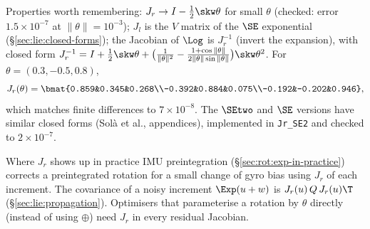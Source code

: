 Properties worth remembering: $J_r\to I-\frac12\skw\theta$ for small $\theta$ (checked: error $1.5\times10^{-7}$ at $\|\theta\|=10^{-3}$); $J_l$ is the $V$ matrix of the $\SE$ exponential (\S\ref{sec:lie:closed-forms}); the Jacobian of $\Log$ is $J_r^{-1}$ (invert the expansion), with closed form $J_r^{-1}=I+\frac12\skw\theta+\big(\frac1{\|\theta\|^2}-\frac{1+\cos\|\theta\|}{2\|\theta\|\sin\|\theta\|}\big)\skw\theta^2$. For $\theta=(0.3,-0.5,0.8)$,
\[
J_r(\theta)=\bmat{0.859&0.345&0.268\\-0.392&0.884&0.075\\-0.192&-0.202&0.946},
\]
which matches finite differences to $7\times10^{-8}$. The $\SEtwo$ and $\SE$ versions have similar closed forms (Solà et al., appendices), implemented in \texttt{Jr\_SE2} and checked to $2\times10^{-7}$.

\begin{noteb}{Where $J_r$ shows up in practice}
IMU preintegration (\S\ref{sec:rot:exp-in-practice}) corrects a preintegrated rotation for a small change of gyro bias using $J_r$ of each increment. The covariance of a noisy increment $\Exp(u+w)$ is $J_r(u)\,Q\,J_r(u)\T$ (\S\ref{sec:lie:propagation}). Optimisers that parameterise a rotation by $\theta$ directly (instead of using $\oplus$) need $J_r$ in every residual Jacobian.
\end{noteb}
